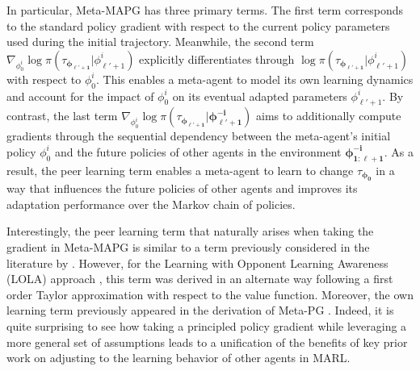 In particular, Meta-MAPG has three primary terms. The first term corresponds to the standard policy gradient with respect to the current policy parameters used during the initial trajectory. Meanwhile, the second term $\nabla_{\phi^{i}_{0}}\log\pi(\tau_{\bm{\phi}_{\bm{\ell'+1}}}|\phi^{i}_{\ell'+1})$ explicitly differentiates through $\log\pi(\tau_{\bm{\phi}_{\bm{\ell'+1}}}|\phi^{i}_{\ell'+1})$ with respect to $\phi^{i}_{0}.$ 
This enables a meta-agent to model its own learning dynamics and account for the impact of $\phi^{i}_{0}$ on its eventual adapted parameters $\phi^{i}_{\ell'+1}$. 
By contrast, the last term $\nabla_{\phi^{i}_{0}}\log\pi(\tau_{\bm{\phi}_{\bm{\ell'+1}}}|\bm{\phi}^{\bm{-i}}_{\bm{\ell'+1}})$ aims to additionally compute gradients through the sequential dependency between the meta-agent's initial policy $\phi^{i}_{0}$ and the future policies of other agents in the environment $\bm{\phi}^{\bm{-i}}_{\bm{1:\ell+1}}$.
As a result, the peer learning term enables a meta-agent to learn to change $\tau_{\bm{\phi}_{\bm{0}}}$ in a way that influences the future policies of other agents and improves its adaptation performance over the Markov chain of policies. 

Interestingly, the peer learning term that naturally arises when taking the gradient in Meta-MAPG is similar to a term previously considered in the literature by \citet{foerster17lola}. 
However, for the Learning with Opponent Learning Awareness (LOLA) approach \citep{foerster17lola}, this term was derived in an alternate way following a first order Taylor approximation with respect to the value function. Moreover, the own learning term previously appeared in the derivation of Meta-PG \citep{alshedivat2018continuous}.
Indeed, it is quite surprising to see how taking a principled policy gradient while leveraging a more general set of assumptions leads to a unification of the benefits of key prior work \citep{alshedivat2018continuous,foerster17lola} on adjusting to the learning behavior of other agents in MARL. 

